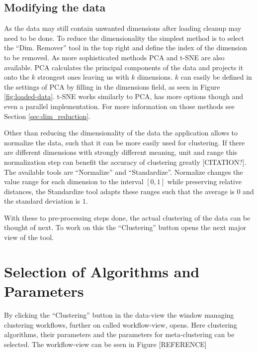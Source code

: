 \documentclass[
	a4paper,
	english,
	twoside,
	openright,               
	11pt                            
	]{report}
\begin{document}
\subsection{Modifying the data}

As the data may still contain unwanted dimensions after loading cleanup may need to be done. To reduce the dimensionality the simplest method is to select the ``Dim. Remover'' tool in the top right and define the index of the dimension to be removed. As more sophisticated methods PCA \cite{pca} and t-SNE \cite{Maaten2008VisualizingDU} are also available. PCA calculates the principal components of the data and projects it onto the $k$ strongest ones leaving us with $k$ dimensions. $k$ can easily be defined in the settings of PCA by filling in the dimensions field, as seen in Figure \ref{fig:loaded-data}. t-SNE works similarly to PCA, has more options though and even a parallel implementation. For more information on those methods see Section \ref{sec:dim_reduction}.

Other than reducing the dimensionality of the data the application allows to normalize the data, such that it can be more easily used for clustering. If there are different dimensions with strongly different meaning, unit and range this normalization step can benefit the accuracy of clustering greatly [CITATION?]. The available tools are ``Normalize'' and ``Standardize''. Normalize changes the value range for each dimension to the interval $[0,1]$ while preserving relative distances, the Standardize tool adapts these ranges such that the average is $0$ and the standard deviation is $1$.

With these to pre-processing steps done, the actual clustering of the data can be thought of next. To work on this the ``Clustering'' button opens the next major view of the tool.

\section{Selection of Algorithms and Parameters}
By clicking the ``Clustering'' button in the data-view the window managing clustering workflows, further on called workflow-view, opens. Here clustering algorithms, their parameters and the parameters for meta-clustering can be selected. The workflow-view can be seen in Figure [REFERENCE]
\end{document}
